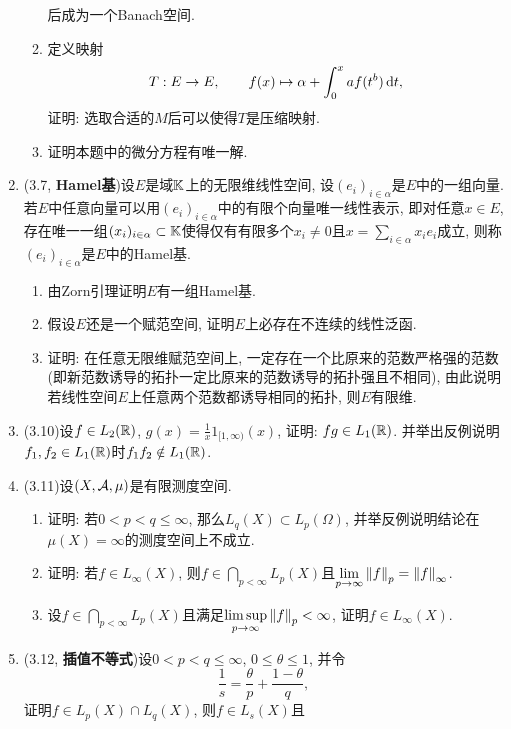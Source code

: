 \begin{enumerate}[label=\textbf{\arabic*.}, ref=\arabic*]
\begin{enumerate}[(1)]
\[        \]
        后成为一个Banach空间.
        \item 定义映射
        \[
        T : E\to E,\qquad f(x)\mapsto\alpha+\int_0^x af(t^b)\,\mathrm{d} t,
        \]
        证明: 选取合适的$ M $后可以使得$ T $是压缩映射.
        \item 证明本题中的微分方程有唯一解. 
        \end{enumerate}
    \item (3.7, \textbf{Hamel基})设$ E $是域$ \mathbb{K} $上的无限维线性空间, 设$ (e_i)_{i\in\alpha} $是$ E $中的一组向量. 若$ E $中任意向量可以用$ (e_i)_{i\in\alpha} $中的有限个向量唯一线性表示, 即对任意$ x\in E $, 存在唯一一组$ (x_i)_{i\in\alpha}\subset\mathbb{K} $使得仅有有限多个$ x_i\ne 0 $且$ x=\sum\limits_{i\in\alpha}x_ie_i $成立, 则称$ (e_i)_{i\in\alpha} $是$ E $中的Hamel基.
        \begin{enumerate}[(1)]
        \item 由Zorn引理证明$ E $有一组Hamel基.
        \item 假设$ E $还是一个赋范空间, 证明$ E $上必存在不连续的线性泛函.
        \item 证明: 在任意无限维赋范空间上, 一定存在一个比原来的范数严格强的范数(即新范数诱导的拓扑一定比原来的范数诱导的拓扑强且不相同), 由此说明若线性空间$ E $上任意两个范数都诱导相同的拓扑, 则$ E $有限维. 
        \end{enumerate}
    \item (3.10)设$ f\in L_2(\mathbb{R}) $, $ g(x)=\frac{1}{x}1_{[1,\infty)}(x) $, 证明: $ fg\in L_1(\mathbb{R}) $. 并举出反例说明$ f_1,f_2\in L_1(\mathbb{R}) $时$ f_1f_2\notin L_1(\mathbb{R}) $. 
    \item (3.11)设$ (X,\mathcal{A}, \mu) $是有限测度空间.
        \begin{enumerate}[(1)]
        \item 证明: 若$ 0<p<q\leqslant\infty $, 那么$ L_q(X)\subset L_p(\varOmega) $, 并举反例说明结论在$ \mu(X)=\infty $的测度空间上不成立.
        \item 证明: 若$ f\in L_\infty(X) $, 则$ f\in\bigcap_{p<\infty}L_p(X) $且$ \lim\limits_{p\to\infty}\left\| f \right\|_p=\left\| f \right\|_\infty $.
        \item 设$ f\in\bigcap_{p<\infty}L_p(X) $且满足$ \limsup\limits_{p\to\infty}\left\| f \right\|_p<\infty $, 证明$ f\in L_\infty(X) $. 
        \end{enumerate}
    \item (3.12, \textbf{插值不等式})设$ 0<p<q\leqslant\infty $, $ 0\leqslant\theta\leqslant 1 $, 并令
        \[
        \frac{1}{s}=\frac{\theta}{p}+\frac{1-\theta}{q},
        \]
        证明$ f\in L_p(X)\cap L_q(X) $, 则$ f\in L_s(X) $且

\end{enumerate}
